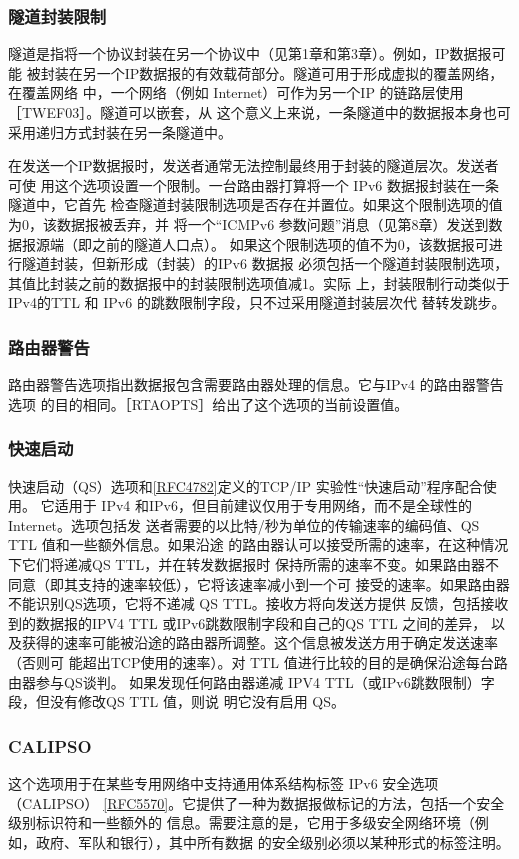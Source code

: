 \subsubsection{隧道封装限制}
隧道是指将一个协议封装在另一个协议中（见第1章和第3章）。例如，IP数据报可能
被封装在另一个IP数据报的有效载荷部分。隧道可用于形成虚拟的覆盖网络，在覆盖网络
中，一个网络（例如 Internet）可作为另一个IP 的链路层使用［TWEF03］。隧道可以嵌套，从
这个意义上来说，一条隧道中的数据报本身也可采用递归方式封装在另一条隧道中。

在发送一个IP数据报时，发送者通常无法控制最终用于封装的隧道层次。发送者可使
用这个选项设置一个限制。一台路由器打算将一个 IPv6 数据报封装在一条隧道中，它首先
检查隧道封装限制选项是否存在并置位。如果这个限制选项的值为0，该数据报被丢弃，并
将一个“ICMPv6 参数问题”消息（见第8章）发送到数据报源端（即之前的隧道人口点）。
如果这个限制选项的值不为0，该数据报可进行隧道封装，但新形成（封装）的IPv6 数据报
必须包括一个隧道封装限制选项，其值比封装之前的数据报中的封装限制选项值减1。实际
上，封装限制行动类似于IPv4的TTL 和 IPv6 的跳数限制字段，只不过采用隧道封装层次代
替转发跳步。

\subsubsection{路由器警告}
路由器警告选项指出数据报包含需要路由器处理的信息。它与IPv4 的路由器警告选项
的目的相同。［RTAOPTS］给出了这个选项的当前设置值。

\subsubsection{快速启动}
快速启动（QS）选项和\href{https://www.rfc-editor.org/rfc/rfc4782}{[RFC4782]}定义的TCP/IP 实验性“快速启动”程序配合使用。
它适用于 IPv4 和IPv6，但目前建议仅用于专用网络，而不是全球性的 Internet。选项包括发
送者需要的以比特/秒为单位的传输速率的编码值、QS TTL 值和一些额外信息。如果沿途
的路由器认可以接受所需的速率，在这种情况下它们将递减QS TTL，并在转发数据报时
保持所需的速率不变。如果路由器不同意（即其支持的速率较低），它将该速率减小到一个可
接受的速率。如果路由器不能识别QS选项，它将不递减 QS TTL。接收方将向发送方提供
反馈，包括接收到的数据报的IPV4 TTL 或IPv6跳数限制字段和自己的QS TTL 之间的差异，
以及获得的速率可能被沿途的路由器所调整。这个信息被发送方用于确定发送速率（否则可
能超出TCP使用的速率）。对 TTL 值进行比较的目的是确保沿途每台路由器参与QS谈判。
如果发现任何路由器递减 IPV4 TTL（或IPv6跳数限制）字段，但没有修改QS TTL 值，则说
明它没有启用 QS。

\subsubsection{CALIPSO}
这个选项用于在某些专用网络中支持通用体系结构标签 IPv6 安全选项（CALIPSO）
\href{https://www.rfc-editor.org/rfc/rfc5570}{[RFC5570]}。它提供了一种为数据报做标记的方法，包括一个安全级别标识符和一些额外的
信息。需要注意的是，它用于多级安全网络环境（例如，政府、军队和银行），其中所有数据
的安全级别必须以某种形式的标签注明。

